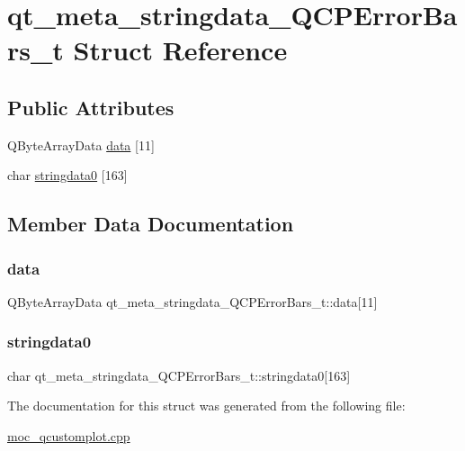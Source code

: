 \hypertarget{structqt__meta__stringdata__QCPErrorBars__t}{}\section{qt\+\_\+meta\+\_\+stringdata\+\_\+\+Q\+C\+P\+Error\+Bars\+\_\+t Struct Reference}
\label{structqt__meta__stringdata__QCPErrorBars__t}
\subsection*{Public Attributes}
\begin{DoxyCompactItemize}
\item 
Q\+Byte\+Array\+Data \mbox{\hyperlink{structqt__meta__stringdata__QCPErrorBars__t_a806cc685f8b46afdca68d6d320f2450b}{data}} \mbox{[}11\mbox{]}
\item 
char \mbox{\hyperlink{structqt__meta__stringdata__QCPErrorBars__t_a651dca586cf4ad7d2d0c36d8723c59b2}{stringdata0}} \mbox{[}163\mbox{]}
\end{DoxyCompactItemize}


\subsection{Member Data Documentation}
\mbox{\label{structqt__meta__stringdata__QCPErrorBars__t_a806cc685f8b46afdca68d6d320f2450b}} 
\subsubsection{\texorpdfstring{data}{data}}
{\footnotesize\ttfamily Q\+Byte\+Array\+Data qt\+\_\+meta\+\_\+stringdata\+\_\+\+Q\+C\+P\+Error\+Bars\+\_\+t\+::data\mbox{[}11\mbox{]}}

\mbox{\label{structqt__meta__stringdata__QCPErrorBars__t_a651dca586cf4ad7d2d0c36d8723c59b2}} 
\subsubsection{\texorpdfstring{stringdata0}{stringdata0}}
{\footnotesize\ttfamily char qt\+\_\+meta\+\_\+stringdata\+\_\+\+Q\+C\+P\+Error\+Bars\+\_\+t\+::stringdata0\mbox{[}163\mbox{]}}



The documentation for this struct was generated from the following file\+:\begin{DoxyCompactItemize}
\item 
\mbox{\hyperlink{moc__qcustomplot_8cpp}{moc\+\_\+qcustomplot.\+cpp}}\end{DoxyCompactItemize}
